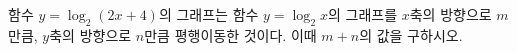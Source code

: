 함수 $y=\log_2 (2x+4)$의 그래프는 함수 $y=\log_2 x$의 그래프를 $x$축의 방향으로 $m$만큼, $y$축의 방향으로 $n$만큼 평행이동한 것이다. 이때 $m+n$의 값을 구하시오.
